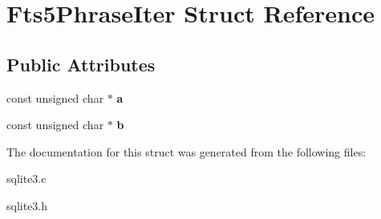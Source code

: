 \hypertarget{structFts5PhraseIter}{}\section{Fts5\+Phrase\+Iter Struct Reference}
\label{structFts5PhraseIter}
\subsection*{Public Attributes}
\begin{DoxyCompactItemize}
\item 
const unsigned char $\ast$ {\bfseries a}\hypertarget{structFts5PhraseIter_ae7989e86f7246b1edf3f090867ae0604}{}\label{structFts5PhraseIter_ae7989e86f7246b1edf3f090867ae0604}

\item 
const unsigned char $\ast$ {\bfseries b}\hypertarget{structFts5PhraseIter_ac783edf6256522bd2a48a35bee957327}{}\label{structFts5PhraseIter_ac783edf6256522bd2a48a35bee957327}

\end{DoxyCompactItemize}


The documentation for this struct was generated from the following files\+:\begin{DoxyCompactItemize}
\item 
sqlite3.\+c\item 
sqlite3.\+h\end{DoxyCompactItemize}
